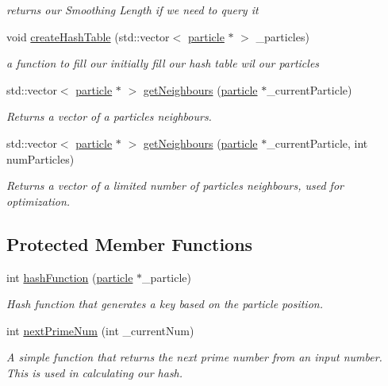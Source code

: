\begin{DoxyCompactItemize}
\begin{DoxyCompactList}\small\item\em returns our Smoothing Length if we need to query it \end{DoxyCompactList}\item 
void \hyperlink{classSPHHash_a2a4792b43ef215f7e2732cb77ea6e788}{create\-Hash\-Table} (std\-::vector$<$ \hyperlink{classparticle}{particle} $\ast$ $>$ \-\_\-particles)
\begin{DoxyCompactList}\small\item\em a function to fill our initially fill our hash table wil our particles \end{DoxyCompactList}\item 
std\-::vector$<$ \hyperlink{classparticle}{particle} $\ast$ $>$ \hyperlink{classSPHHash_a6d83b8f854980ef78d6e7e65c713074d}{get\-Neighbours} (\hyperlink{classparticle}{particle} $\ast$\-\_\-current\-Particle)
\begin{DoxyCompactList}\small\item\em Returns a vector of a particles neighbours. \end{DoxyCompactList}\item 
std\-::vector$<$ \hyperlink{classparticle}{particle} $\ast$ $>$ \hyperlink{classSPHHash_ab82b9de0e52cf1bd70cd508bdfd4f1c9}{get\-Neighbours} (\hyperlink{classparticle}{particle} $\ast$\-\_\-current\-Particle, int num\-Particles)
\begin{DoxyCompactList}\small\item\em Returns a vector of a limited number of particles neighbours, used for optimization. \end{DoxyCompactList}\end{DoxyCompactItemize}
\subsection*{Protected Member Functions}
\begin{DoxyCompactItemize}
\item 
int \hyperlink{classSPHHash_a3c4deda30ec87a73d29f6c0b949dd61e}{hash\-Function} (\hyperlink{classparticle}{particle} $\ast$\-\_\-particle)
\begin{DoxyCompactList}\small\item\em Hash function that generates a key based on the particle position. \end{DoxyCompactList}\item 
int \hyperlink{classSPHHash_a3a8bfb900e3f8939134b68d992a4e44b}{next\-Prime\-Num} (int \-\_\-current\-Num)
\begin{DoxyCompactList}\small\item\em A simple function that returns the next prime number from an input number. This is used in calculating our hash. \end{DoxyCompactList}\end{DoxyCompactItemize}


